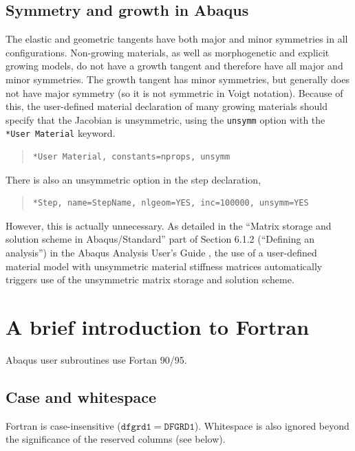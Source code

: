 \documentclass[10pt,letterpaper,oneside]{report}
\begin{document}
\section{Symmetry and growth in Abaqus}
The elastic and geometric tangents have both major and minor symmetries in all configurations.  Non-growing materials, as well as morphogenetic and explicit growing models, do not have a growth tangent and therefore have all major and minor symmetries.  
The growth tangent has minor symmetries, but generally does not have major symmetry (so it is not symmetric in Voigt notation).  
Because of this, the user-defined material declaration of many growing materials should specify that the Jacobian is unsymmetric, using the \texttt{unsymm} option with the \texttt{*User Material} keyword. 
\begin{quote} 
    \begin{lstlisting}[]
      *User Material, constants=nprops, unsymm
    \end{lstlisting} \end{quote}
    There is also an unsymmetric option in the step declaration, 
    \begin{quote} \begin{lstlisting}[]
      *Step, name=StepName, nlgeom=YES, inc=100000, unsymm=YES
    \end{lstlisting} 
\end{quote}
However, this is actually unnecessary.  As detailed in the ``Matrix storage and solution scheme in Abaqus/Standard'' part of Section 6.1.2 (``Defining an analysis'') in the Abaqus Analysis User's Guide \autocite[Sec.~6.1.2]{AbaqusAnalysis}, the use of a user-defined material model with unsymmetric material stiffness matrices automatically triggers use of the unsymmetric matrix storage and solution scheme.  

\chapter{A brief introduction to Fortran}

Abaqus user subroutines use Fortan 90/95.  

\section{Case and whitespace}
Fortran is case-insensitive ($\mathtt{dfgrd1} = \mathtt{DFGRD1}$).  Whitespace is also ignored beyond the significance of the reserved columns (see below).
\end{document}
